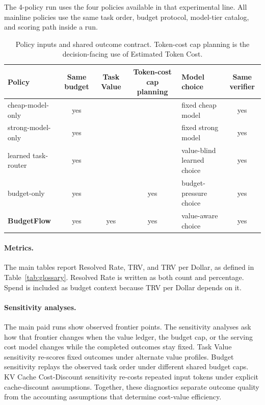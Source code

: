 \documentclass{article}
\newcommand{\method}{BudgetFlow\xspace}
\newcommand{\trv}{TRV\xspace}
\begin{document}
The 4-policy run uses the four policies available in that experimental line. All mainline policies use the same task order, budget protocol, model-tier catalog, and scoring path inside a run.

\begin{table}[t]
\centering
\small
\begin{tabular}{lccclc}
\toprule
Policy & Same budget & \textbf{Task Value} & Token-cost cap planning & Model choice & Same verifier \\
\midrule
cheap-model-only & yes &  &  & fixed cheap model & yes \\
strong-model-only & yes &  &  & fixed strong model & yes \\
learned task-router & yes &  &  & value-blind learned choice & yes \\
budget-only & yes &  & yes & budget-pressure choice & yes \\
\textbf{\method} & yes & yes & yes & value-aware choice & yes \\
\bottomrule
\end{tabular}
\caption{Policy inputs and shared outcome contract. Token-cost cap planning is the decision-facing use of Estimated Token Cost.}
\label{tab:policies}
\end{table}

\paragraph{Metrics.}
The main tables report Resolved Rate, \trv, and \trv per Dollar, as defined in Table~\ref{tab:glossary}. Resolved Rate is written as both count and percentage. Spend is included as budget context because \trv per Dollar depends on it.

\paragraph{Sensitivity analyses.}
The main paid runs show observed frontier points. The sensitivity analyses ask how that frontier changes when the value ledger, the budget cap, or the serving cost model changes while the completed outcomes stay fixed. Task Value sensitivity re-scores fixed outcomes under alternate value profiles. Budget sensitivity replays the observed task order under different shared budget caps. KV Cache Cost-Discount sensitivity re-costs repeated input tokens under explicit cache-discount assumptions. Together, these diagnostics separate outcome quality from the accounting assumptions that determine cost-value efficiency.
\end{document}
